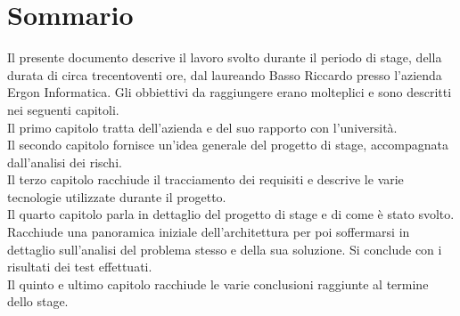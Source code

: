 
\cleardoublepage
{}
{}
\begingroup
\let\clearpage\relax
\let\cleardoublepage\relax
\let\cleardoublepage\relax

\chapter*{Sommario}

Il presente documento descrive il lavoro svolto durante il periodo di stage, della durata di circa trecentoventi ore, dal laureando Basso Riccardo presso l'azienda Ergon Informatica. 
Gli obbiettivi da raggiungere erano molteplici e sono descritti nei seguenti capitoli.\\
Il primo capitolo tratta dell'azienda e del suo rapporto con l'università.\\
Il secondo capitolo fornisce un'idea generale del progetto di stage, accompagnata dall'analisi dei rischi.\\
Il terzo capitolo racchiude il tracciamento dei requisiti e descrive le varie tecnologie utilizzate durante il progetto.\\
Il quarto capitolo parla in dettaglio del progetto di stage e di come è stato svolto. Racchiude una panoramica iniziale dell'architettura per poi soffermarsi in dettaglio
sull'analisi del problema stesso e della sua soluzione. Si conclude con i risultati dei test effettuati.\\
Il quinto e ultimo capitolo racchiude le varie conclusioni raggiunte al termine dello stage.\\


%
%

\endgroup			

\vfill

